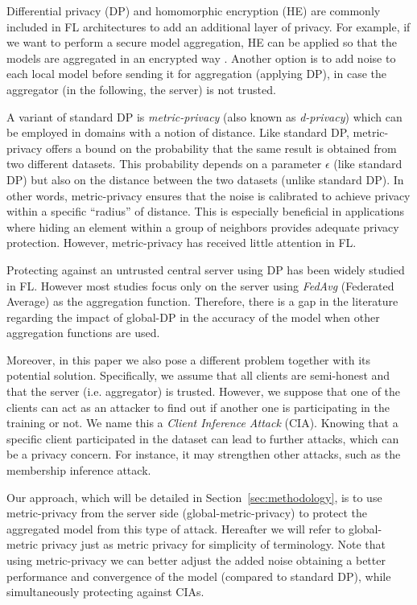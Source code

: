 \documentclass[5p,times]{elsarticle}
\begin{document}
Differential privacy (DP) and homomorphic encryption (HE)
are commonly included in FL architectures to add an additional layer of privacy. For example, if we want to perform a secure model aggregation, HE can be applied so that the models are aggregated in an encrypted way \cite{ma2022privacy}. Another option is to add noise to each local model before sending it for aggregation (applying DP), in case the aggregator (in the following, the server) is not trusted.

A variant of standard DP is \emph{metric-privacy} (also known as \textit{d-privacy}) \cite{dprivacy, alvim2018metric} which can be employed in domains with a notion of distance. Like standard DP, metric-privacy offers a bound on the probability that the same result is obtained from two different datasets. This probability depends on a parameter $\epsilon$ (like standard DP) but also on the distance between the two datasets (unlike standard DP). In other words, metric-privacy ensures that the noise is calibrated to achieve privacy within a specific ``radius'' of distance. This is especially beneficial in applications where hiding an element within a group of neighbors provides adequate privacy protection. However, metric-privacy has received little attention in FL. 

Protecting against an untrusted central server using DP has been widely studied in FL. However most studies focus only on the server using \emph{FedAvg} (Federated Average) as the aggregation function. Therefore, there is a gap in the literature regarding the impact of global-DP in the accuracy of the model when other aggregation functions are used. 

Moreover, in this paper we also pose a different problem together with its potential solution. Specifically,  we assume that all clients are semi-honest and that the server (i.e. aggregator) is trusted. However, we suppose that one of the clients can act as an attacker to find out if another one is participating in the training or not. We name this a \emph{Client Inference Attack} (CIA). Knowing that a specific client participated in the dataset can lead to further attacks, which can be a privacy concern. For instance, it may strengthen other attacks, such as the membership inference attack.

Our approach, which will be detailed in Section~\ref{sec:methodology}, is to use metric-privacy from the server side (global-metric-privacy) to protect the aggregated model from this type of attack. Hereafter we will refer to global-metric privacy just as metric privacy for simplicity of terminology. Note that using metric-privacy we can better adjust the added noise obtaining a better performance and convergence of the model (compared to standard DP), while simultaneously protecting against CIAs.  
\end{document}
